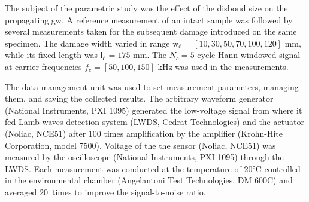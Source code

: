 The subject of the parametric study was the effect of the disbond size on the propagating \ac{gw}.
A reference measurement of an intact sample was followed by several measurements taken for the subsequent damage introduced on the same specimen.
The damage width varied in range \(\mathrm{w_d}=\left [10, 30, 50, 70, 100, 120 \right ]\) \unit{\mm}, while its fixed length was \(\mathrm{l_d} = 175\) \unit{\mm}.
%
%
The \(N_c=5\) cycle Hann windowed signal at carrier frequencies \(f_c=[50,100,150]\) \unit{\kHz} was used in the measurements.

The data management unit was used to set measurement parameters, managing them, and saving the collected results.
The arbitrary waveform generator (National Instruments, PXI 1095) generated the low-voltage signal from where it fed Lamb waves detection system (LWDS, Cedrat Technologies) and the actuator (Noliac, NCE51) after 100 times amplification by the  amplifier (Krohn-Hite Corporation, model 7500).
Voltage of the the sensor (Noliac, NCE51) was measured by the oscilloscope (National Instruments, PXI 1095) through the LWDS.
Each measurement was conducted at the temperature of 20\unit{\degreeCelsius} controlled in the environmental chamber (Angelantoni Test Technologies, DM 600C) and averaged 20~times to improve the signal-to-noise ratio.